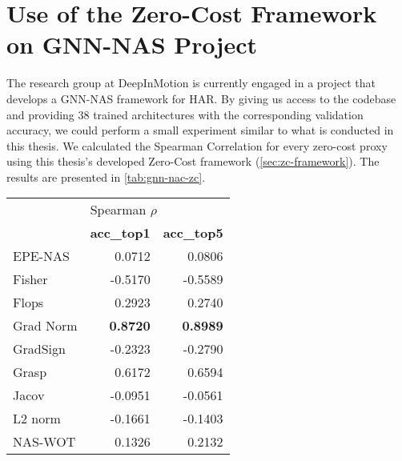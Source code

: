 
\chapter{Use of the Zero-Cost Framework on GNN-NAS Project}
\label{app:gnn-nas}

The research group at DeepInMotion is currently engaged in a project that develops a \gls{GNN}-\gls{NAS} framework for \gls{HAR}. By giving us access to the codebase and providing 38 trained architectures with the corresponding validation accuracy, we could perform a small experiment similar to what is conducted in this thesis. We calculated the Spearman Correlation for every zero-cost proxy using this thesis's developed Zero-Cost framework (\cref{sec:zc-framework}). The results are presented in \cref{tab:gnn-nac-zc}. 

\begin{table}[!h]
    \centering
    {\footnotesize \begin{tabular}{l|rr}
                            & \multicolumn{2}{l}{Spearman $\rho$}                          \\ 
                            & \cellcolor[HTML]{EFEFEF}\textbf{acc\_top1}              & \cellcolor[HTML]{EFEFEF}\textbf{acc\_top5}              \\ \hline
        EPE-NAS   & 0.0712                          & 0.0806                          \\ 
        \cellcolor[HTML]{EFEFEF}Fisher     & \cellcolor[HTML]{EFEFEF}-0.5170 & \cellcolor[HTML]{EFEFEF}-0.5589 \\ 
        Flops      & 0.2923                          & 0.2740                          \\ 
        \cellcolor[HTML]{EFEFEF}Grad Norm & \cellcolor[HTML]{EFEFEF}\textbf{0.8720}  & \cellcolor[HTML]{EFEFEF}\textbf{0.8989}  \\ 
        GradSign & -0.2323                         & -0.2790                         \\ 
        \cellcolor[HTML]{EFEFEF}Grasp      & \cellcolor[HTML]{EFEFEF}0.6172  & \cellcolor[HTML]{EFEFEF}0.6594  \\ 
        Jacov      & -0.0951                         & -0.0561                         \\ 
        \cellcolor[HTML]{EFEFEF}L2 norm   & \cellcolor[HTML]{EFEFEF}-0.1661 & \cellcolor[HTML]{EFEFEF}-0.1403 \\ 
        NAS-WOT       & 0.1326                          & 0.2132                          \\ 

\end{tabular}}
\end{table}
